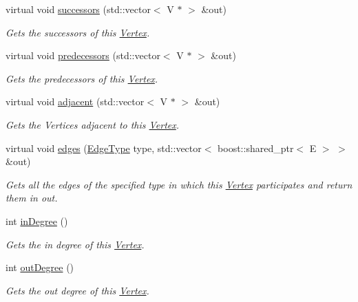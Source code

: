 \begin{DoxyCompactItemize}
virtual void \hyperlink{classrepast_1_1_undirected_vertex_a56412695224db7050d7221b5c714d826}{successors} (std\-::vector$<$ V $\ast$ $>$ \&out)
\begin{DoxyCompactList}\small\item\em Gets the successors of this \hyperlink{classrepast_1_1_vertex}{Vertex}. \end{DoxyCompactList}\item 
virtual void \hyperlink{classrepast_1_1_undirected_vertex_ab1c49c0e2c934c6e4a85c52ed54f4da7}{predecessors} (std\-::vector$<$ V $\ast$ $>$ \&out)
\begin{DoxyCompactList}\small\item\em Gets the predecessors of this \hyperlink{classrepast_1_1_vertex}{Vertex}. \end{DoxyCompactList}\item 
virtual void \hyperlink{classrepast_1_1_undirected_vertex_ae3637a55efcc146a09d58edc5b3beb28}{adjacent} (std\-::vector$<$ V $\ast$ $>$ \&out)
\begin{DoxyCompactList}\small\item\em Gets the Vertices adjacent to this \hyperlink{classrepast_1_1_vertex}{Vertex}. \end{DoxyCompactList}\item 
virtual void \hyperlink{classrepast_1_1_undirected_vertex_a3b87912676b53a0352dff58cfa1222fe}{edges} (\hyperlink{classrepast_1_1_vertex_a8b4819d648c7c0dd8b0622beea77cc14}{Edge\-Type} type, std\-::vector$<$ boost\-::shared\-\_\-ptr$<$ E $>$ $>$ \&out)
\begin{DoxyCompactList}\small\item\em Gets all the edges of the specified type in which this \hyperlink{classrepast_1_1_vertex}{Vertex} participates and return them in out. \end{DoxyCompactList}\item 
int \hyperlink{classrepast_1_1_undirected_vertex_a6bb8fff1b36c0363306aa86615cf48f4}{in\-Degree} ()
\begin{DoxyCompactList}\small\item\em Gets the in degree of this \hyperlink{classrepast_1_1_vertex}{Vertex}. \end{DoxyCompactList}\item 
int \hyperlink{classrepast_1_1_undirected_vertex_a262a52d25ccf1f7f6e2433c01f1fb8e8}{out\-Degree} ()
\begin{DoxyCompactList}\small\item\em Gets the out degree of this \hyperlink{classrepast_1_1_vertex}{Vertex}. \end{DoxyCompactList}\end{DoxyCompactItemize}



